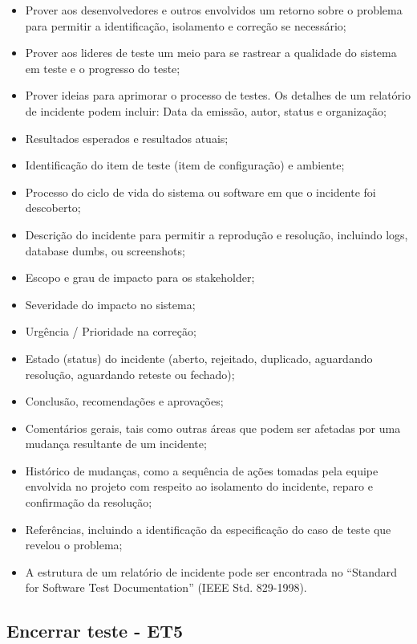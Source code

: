 \begin{itemize}
    \item Prover aos desenvolvedores e outros envolvidos um retorno sobre o problema para permitir a identificação, isolamento e correção se necessário;
    \item Prover aos lideres de teste um meio para se rastrear a qualidade do sistema em teste e o progresso do teste;
    \item Prover ideias para aprimorar o processo de testes. Os detalhes de um relatório de incidente podem incluir: Data da emissão, autor, status e organização;
    \item Resultados esperados e resultados atuais;
    \item Identificação do item de teste (item de configuração) e ambiente;
    \item Processo do ciclo de vida do sistema ou software em que o incidente foi descoberto;
    \item Descrição do incidente para permitir a reprodução e resolução, incluindo logs, database dumbs, ou screenshots;
    \item Escopo e grau de impacto para os stakeholder;
    \item Severidade do impacto no sistema;
    \item Urgência / Prioridade na correção;
    \item Estado (status) do incidente (aberto, rejeitado, duplicado, aguardando resolução, aguardando reteste ou fechado);
    \item Conclusão, recomendações e aprovações;
    \item Comentários gerais, tais como outras áreas que podem ser afetadas por uma mudança resultante de um incidente;
    \item Histórico de mudanças, como a sequência de ações tomadas pela equipe envolvida no projeto com respeito ao isolamento do incidente, reparo e confirmação da resolução;
    \item Referências, incluindo a identificação da especificação do caso de teste que revelou o problema;
    \item A estrutura de um relatório de incidente pode ser encontrada no “Standard for Software Test Documentation” (IEEE Std. 829-1998).
\end{itemize}

\subsection{Encerrar teste - ET5}
\label{sec:guiaet5}

